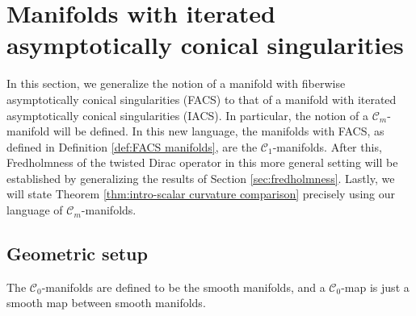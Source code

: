 \documentclass[12pt, reqno]{amsart}
\theoremstyle{plain} %
\theoremstyle{definition}
\theoremstyle{remark}
\numberwithin{equation}{section}
\newcommand{\cat}[1]{\mathcal{#1}}
\begin{document}
\section{Manifolds with iterated asymptotically conical singularities}\label{sec:manifolds with iacs}
In this section, we generalize the notion of a manifold with fiberwise asymptotically conical singularities (FACS) to that of a manifold with iterated asymptotically conical singularities (IACS).
In particular, the notion of a \(\cat{C}_m\)-manifold will be defined.
In this new language, the manifolds with FACS, as defined in Definition \ref{def:FACS manifolds}, are the \(\cat{C}_1\)-manifolds.
After this, Fredholmness of the twisted Dirac operator in this more general setting will be established by generalizing the results of Section \ref{sec:fredholmness}.
Lastly, we will state Theorem \ref{thm:intro-scalar curvature comparison} precisely using our language of \(\cat{C}_m\)-manifolds.

\subsection{Geometric setup}
The \(\cat{C}_0\)-manifolds are defined to be the smooth manifolds, and a \(\cat{C}_0\)-map is just a smooth map between smooth manifolds.
\end{document}
